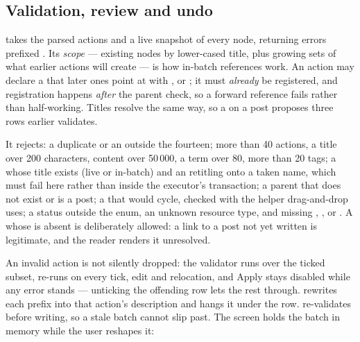 \subsection{Validation, review and undo}

 takes the parsed actions and a live snapshot of every node, returning errors prefixed
. Its \emph{scope} --- existing nodes by lower-cased title, plus growing sets of what
earlier actions will create --- is how in-batch references work. An action may declare a  that
later ones point at with ,  or ; it must \emph{already} be
registered, and registration happens \emph{after} the parent check, so a forward reference fails rather than
half-working. Titles resolve the same way, so a  on a post  proposes
three rows earlier validates.

It rejects: a duplicate  or an  outside the fourteen; more than 40 actions, a title over
200 characters, content over 50\,000, a term over 80, more than 20 tags; a  whose title exists
(live or in-batch) and an  retitling onto a taken name, which must fail here rather than
inside the executor's transaction; a parent that does not exist or is a post; a  that would
cycle, checked with the  helper drag-and-drop uses; a status outside the enum, an unknown
resource type, and missing , ,  or . A 
whose  is absent is deliberately allowed: a link to a post not yet written is legitimate, and
the reader renders it unresolved.

An invalid action is not silently dropped: the validator runs over the ticked subset, re-runs on every tick,
edit and relocation, and Apply stays disabled while any error stands --- unticking the offending row lets
the rest through.  rewrites each  prefix into that action's
description and hangs it under the row.  re-validates before writing, so a stale batch cannot
slip past. The screen holds the batch in memory while the user reshapes it:

